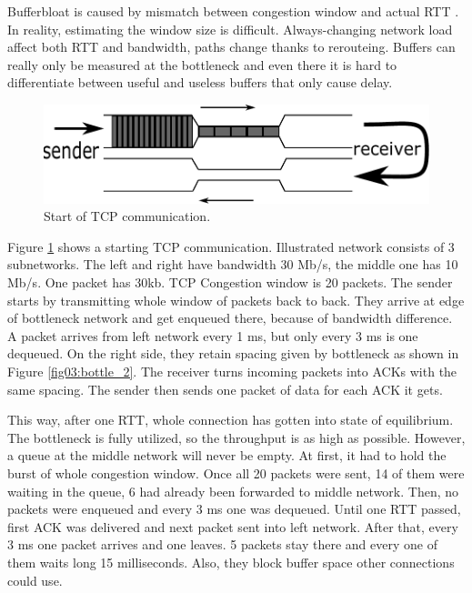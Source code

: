 Bufferbloat is caused by mismatch between congestion window and actual RTT \cite{CoDel}. In reality, estimating the window size is difficult. Always-changing network load affect both RTT and bandwidth, paths change thanks to rerouteing. Buffers can really only be measured at the bottleneck and even there it is hard to differentiate between useful and useless buffers that only cause delay.

\begin{figure}
	\centering
	\includegraphics[width=137mm]{drawings/tcp_bottleneck_1}
	\caption{Start of TCP communication.}
	
	\label{fig02:bottle_1}
\end{figure}


Figure \ref{fig02:bottle_1} shows a starting TCP communication. Illustrated network consists of 3 subnetworks. The left and right have bandwidth 30 Mb/s, the middle one has 10 Mb/s. One packet has 30kb. TCP Congestion window is 20 packets. The sender starts by transmitting whole window of packets back to back. They arrive at edge of bottleneck network and get enqueued there, because of bandwidth difference. A packet arrives from left network every 1 ms, but only every 3 ms is one dequeued. On the right side, they retain spacing given by bottleneck as shown in Figure \ref{fig03:bottle_2}. The receiver turns incoming packets into ACKs with the same spacing. The sender then sends one packet of data for each ACK it gets.

This way, after one RTT, whole connection has gotten into state of equilibrium. The bottleneck is fully utilized, so the throughput is as high as possible. However, a queue at the middle network will never be empty. At first, it had to hold the burst of whole congestion window. Once all 20 packets were sent, 14 of them were waiting in the queue, 6 had already been forwarded to middle network. Then, no packets were enqueued and every 3 ms one was dequeued. Until one RTT passed, first ACK was delivered and next packet sent into left network. After that, every 3 ms one packet arrives and one leaves. 5 packets stay there and every one of them waits long 15 milliseconds. Also, they block buffer space other connections could use. 

